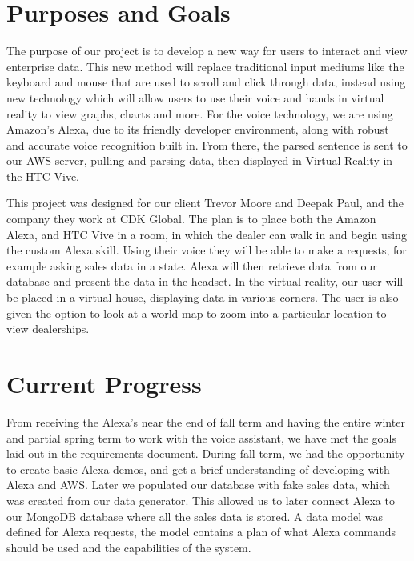 \documentclass[onecolumn, draftclsnofoot,10pt, compsoc]{IEEEtran}
\begin{document}
\section{Purposes and Goals}
The purpose of our project is to develop a new way for users to interact and view enterprise data. This new method will replace traditional input mediums like the keyboard and mouse that are used to scroll and click through data, instead using new technology which will allow users to use their voice and hands in virtual reality to view graphs, charts and more. For the voice technology, we are using Amazon's Alexa, due to its friendly developer environment, along with robust and accurate voice recognition built in. From there, the parsed sentence is sent to our AWS server, pulling and parsing data, then displayed in Virtual Reality in the HTC Vive. \newline

This project was designed for our client Trevor Moore and Deepak Paul, and the company they work at CDK Global. The plan is to place both the Amazon Alexa, and HTC Vive in a room, in which the dealer can walk in and begin using the custom Alexa skill. Using their voice they will be able to make a requests, for example asking sales data in a state. Alexa will then retrieve data from our database and present the data in the headset. In the virtual reality, our user will be placed in a virtual house, displaying data in various corners. The user is also given the option to look at a world map to zoom into a particular location to view dealerships.\newline


\section{Current Progress}

From receiving the Alexa's near the end of fall term and having the entire winter and partial spring term to work with the voice assistant, we have met the goals laid out in the requirements document. During fall term, we had the opportunity to create basic Alexa demos, and get a brief understanding of developing with Alexa and AWS. Later we populated our database with fake sales data, which was created from our data generator. This allowed us to later connect Alexa to our MongoDB database where all the sales data is stored. A data model was defined for Alexa requests, the model contains a plan of what Alexa commands should be used and the capabilities of the system. \newline
\end{document}
